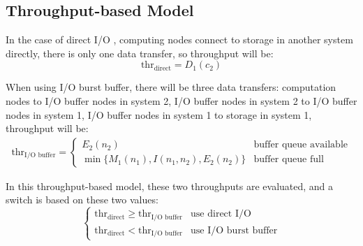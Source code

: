 \subsection{Throughput-based Model}
In the case of direct I/O , computing nodes connect to storage in another system directly, there is only one data transfer, so throughput  will be:%
\begin{equation}
	\text{thr}_{\text{direct}}=D_1(c_2) \label{throughput1}
\end{equation}

When using I/O burst buffer, there will be three data transfers: computation nodes to I/O buffer nodes in system 2, I/O buffer nodes in system 2 to I/O buffer nodes in system 1, I/O buffer nodes in system 1 to storage in system 1, throughput  will be:
\begin{eqnarray}
	\text{thr}_{\text{I/O buffer}}=\begin{cases}
		E_2(n_2) &\text{buffer queue available}\\ 
	\min\{M_1(n_1),I(n_1,n_2),E_2(n_2)\} &\text{buffer queue full}
	\end{cases} \label{throughput2}
\end{eqnarray}

In this throughput-based model, these two throughputs are evaluated, and a switch is based on these two values:
\begin{equation}
	\begin{cases}
		\text{thr}_{\text{direct}} \geq \text{thr}_{\text{I/O buffer}} & \text{use direct I/O}\\
		\text{thr}_{\text{direct}} < \text{thr}_{\text{I/O buffer}} & \text{use I/O burst buffer}
	\end{cases}
\end{equation}


